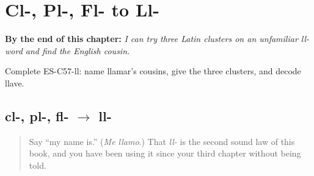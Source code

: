 
\chapter{Cl-, Pl-, Fl- to Ll-}
\label{ch:sound-cluster-ll}

\begin{chapteropening}
\textbf{By the end of this chapter:} \emph{I can try three Latin clusters on an unfamiliar ll- word and find the English cousin.}

Complete ES-C57-ll: name llamar's cousins, give the three clusters, and decode llave.
\end{chapteropening}

\section[cl-, pl-, fl- to ll-]{cl-, pl-, fl- $\to$ ll-}

\label{lesson:ES-C57-ll}



\begin{quote}
Say \textquotedblleft{}my name is.\textquotedblright{} (\emph{Me llamo}.) That \emph{ll-} is the second sound law of this book, and you have been using it since your third chapter without being told.
\end{quote}


